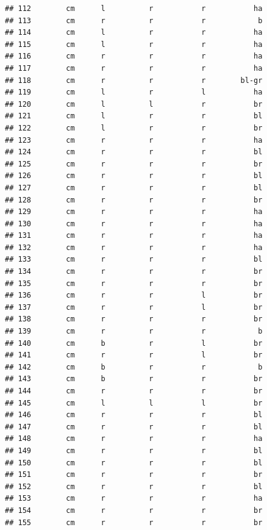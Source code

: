 \documentclass[]{article}
\begin{document}
\begin{verbatim}
## 112        cm      l          r           r           ha
## 113        cm      r          r           r            b
## 114        cm      l          r           r           ha
## 115        cm      l          r           r           ha
## 116        cm      r          r           r           ha
## 117        cm      r          r           r           ha
## 118        cm      r          r           r        bl-gr
## 119        cm      l          r           l           ha
## 120        cm      l          l           r           br
## 121        cm      l          r           r           bl
## 122        cm      l          r           r           br
## 123        cm      r          r           r           ha
## 124        cm      r          r           r           bl
## 125        cm      r          r           r           br
## 126        cm      r          r           r           bl
## 127        cm      r          r           r           bl
## 128        cm      r          r           r           br
## 129        cm      r          r           r           ha
## 130        cm      r          r           r           ha
## 131        cm      r          r           r           ha
## 132        cm      r          r           r           ha
## 133        cm      r          r           r           bl
## 134        cm      r          r           r           br
## 135        cm      r          r           r           br
## 136        cm      r          r           l           br
## 137        cm      r          r           l           br
## 138        cm      r          r           r           br
## 139        cm      r          r           r            b
## 140        cm      b          r           l           br
## 141        cm      r          r           l           br
## 142        cm      b          r           r            b
## 143        cm      b          r           r           br
## 144        cm      r          r           r           br
## 145        cm      l          l           l           br
## 146        cm      r          r           r           bl
## 147        cm      r          r           r           bl
## 148        cm      r          r           r           ha
## 149        cm      r          r           r           bl
## 150        cm      r          r           r           bl
## 151        cm      r          r           r           br
## 152        cm      r          r           r           bl
## 153        cm      r          r           r           ha
## 154        cm      r          r           r           br
## 155        cm      r          r           r           br

\end{verbatim}
\end{document}
